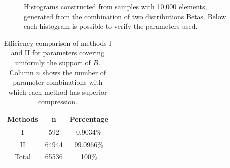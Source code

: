 \documentclass[10pt]{article}
\begin{document}
\begin{figure}[h]
{  }
  \caption{Histograms constructed from samples with 10,000 elements, generated from the combination of two distributions Betas. Below each histogram is possible to verify the parameters used.}
  \label{fig:02B}
\end{figure}

\begin{table}[h]
 \centering
 \caption{Efficiency comparison of methods I and II for parameters covering uniformly the support of $B$. Column $n$ shows the number of parameter combinations with which each method has superior compression.}
 \begin{tabular}{ccc}
  \hline 
  Methods  & n   & Percentage \\
  \hline
  I	   & 592	& 0.9034\% \\
  II	   & 64944	& 99.0966\% \\
  \hline
  Total    & 65536	& 100\% \\
  \hline
 \end{tabular}
 \label{tab:06}
\end{table}
\end{document}
